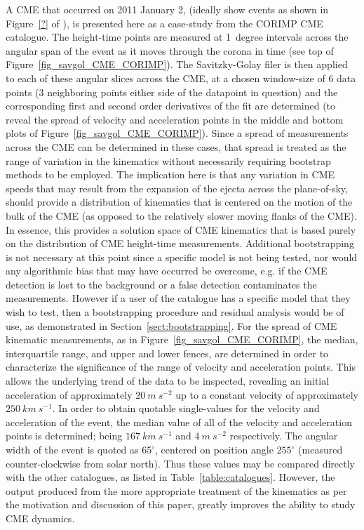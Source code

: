 \documentclass[structabstract]{aa}
\begin{document}
A CME that occurred on 2011 January 2, (ideally show events as shown in Figure~\ref{?} of \citet{2012ApJ...752..145B}), is presented here as a case-study from the CORIMP CME catalogue. The height-time points are measured at 1~degree intervals across the angular span of the event as it moves through the corona in time (see top of Figure~\ref{fig_savgol_CME_CORIMP}). The Savitzky-Golay filer is then applied to each of these angular slices across the CME, at a chosen window-size of 6 data points (3 neighboring points either side of the datapoint in question) and the corresponding first and second order derivatives of the fit are determined (to reveal the spread of velocity and acceleration points in the middle and bottom plots of Figure~\ref{fig_savgol_CME_CORIMP}). Since a spread of measurements across the CME can be determined in these cases, that spread is treated as the range of variation in the kinematics without necessarily requiring bootstrap methods to be employed. The implication here is that any variation in CME speeds that may result from the expansion of the ejecta across the plane-of-sky, should provide a distribution of kinematics that is centered on the motion of the bulk of the CME (as opposed to the relatively slower moving flanks of the CME). In essence, this provides a solution space of CME kinematics that is based purely on the distribution of CME height-time measurements. Additional bootstrapping is not necessary at this point since a specific model is not being tested, nor would any algorithmic bias that may have occurred be overcome, e.g. if the CME detection is lost to the background or a false detection contaminates the measurements. However if a user of the catalogue has a specific model that they wish to test, then a bootstrapping procedure and residual analysis would be of use, as demonstrated in Section~\ref{sect:bootstrapping}. For the spread of CME kinematic measurements, as in Figure~\ref{fig_savgol_CME_CORIMP}, the median, interquartile range, and upper and lower fences, are determined in order to characterize the significance of the range of velocity and acceleration points. This allows the underlying trend of the data to be inspected, revealing an initial acceleration of approximately $20~m~s^{-2}$ up to a constant velocity of approximately $250~km~s^{-1}$. In order to obtain quotable single-values for the velocity and acceleration of the event, the median value of all of the velocity and acceleration points is determined; being $167~km~s^{-1}$ and $4~m~s^{-2}$ respectively. The angular width of the event is quoted as $65^{\circ}$, centered on position angle $255^{\circ}$ (measured counter-clockwise from solar north). Thus these values may be compared directly with the other catalogues, as listed in Table~\ref{table:catalogues}. However, the output produced from the more appropriate treatment of the kinematics as per the motivation and discussion of this paper, greatly improves the ability to study CME dynamics. 
\end{document}
